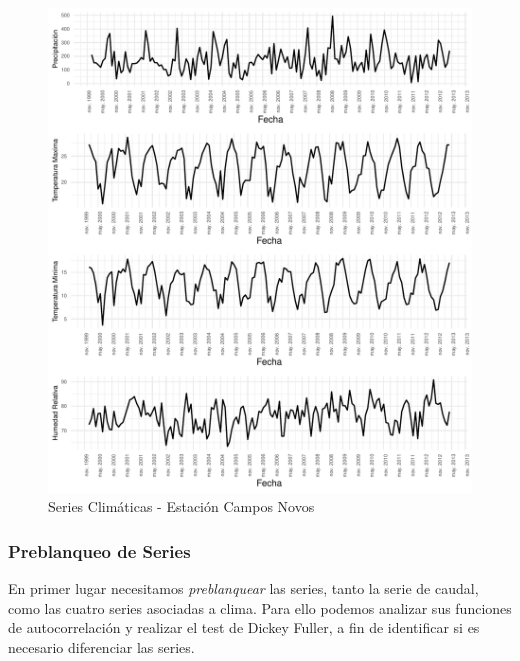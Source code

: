 \documentclass[12pt,oneside]{book}\usepackage[]{graphicx}\usepackage[]{color}
\makeatletter
\def\maxwidth{ %
  \ifdim\Gin@nat@width>\linewidth
    \linewidth
  \else
    \Gin@nat@width
  \fi
}
\newenvironment{knitrout}{}{} %
\theoremstyle{definition} %
\makeatother
\begin{document}
\begin{knitrout}
\color{fgcolor}\begin{figure}[H]

{\centering \includegraphics[width=\maxwidth]{figure/unnamed-chunk-22-1} 

}

\caption{\label{fig:sarimax_serieCl} Series Climáticas - Estación Campos Novos}\label{fig:unnamed-chunk-22}
\end{figure}


\end{knitrout}


\subsubsection{Preblanqueo de Series}

En primer lugar necesitamos \textit{preblanquear} las series, tanto la serie de caudal, como las cuatro series asociadas a clima. Para ello podemos analizar sus funciones de autocorrelación y realizar el test de Dickey Fuller, a fin de identificar si es necesario diferenciar las series. 
\end{document}
